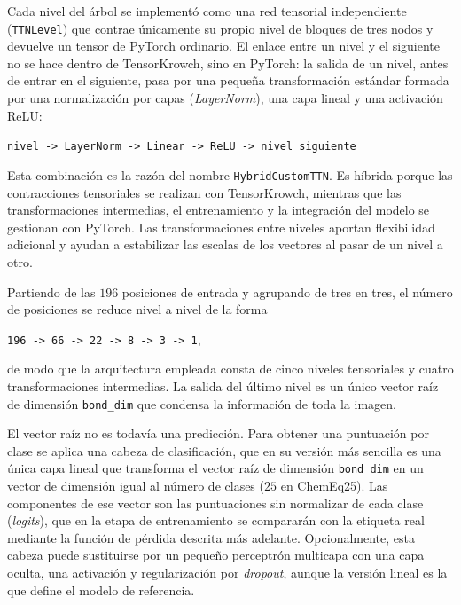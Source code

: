 Cada nivel del árbol se implementó como una red tensorial independiente (\texttt{TTNLevel}) que contrae únicamente su propio nivel de bloques de tres nodos y devuelve un tensor de PyTorch ordinario. El enlace entre un nivel y el siguiente no se hace dentro de TensorKrowch, sino en PyTorch: la salida de un nivel, antes de entrar en el siguiente, pasa por una pequeña transformación estándar formada por una normalización por capas (\textit{LayerNorm}), una capa lineal y una activación ReLU:

\begin{center}
\texttt{nivel -> LayerNorm -> Linear -> ReLU -> nivel siguiente}
\end{center}

Esta combinación es la razón del nombre \texttt{HybridCustomTTN}. Es híbrida porque las contracciones tensoriales se realizan con TensorKrowch, mientras que las transformaciones intermedias, el entrenamiento y la integración del modelo se gestionan con PyTorch. Las transformaciones entre niveles aportan flexibilidad adicional y ayudan a estabilizar las escalas de los vectores al pasar de un nivel a otro.

Partiendo de las $196$ posiciones de entrada y agrupando de tres en tres, el número de posiciones se reduce nivel a nivel de la forma

\begin{center}
\texttt{196 -> 66 -> 22 -> 8 -> 3 -> 1},
\end{center}

de modo que la arquitectura empleada consta de cinco niveles tensoriales y cuatro transformaciones intermedias. La salida del último nivel es un único vector raíz de dimensión \texttt{bond\_dim} que condensa la información de toda la imagen.

El vector raíz no es todavía una predicción. Para obtener una puntuación por clase se aplica una cabeza de clasificación, que en su versión más sencilla es una única capa lineal que transforma el vector raíz de dimensión \texttt{bond\_dim} en un vector de dimensión igual al número de clases ($25$ en ChemEq25). Las componentes de ese vector son las puntuaciones sin normalizar de cada clase (\textit{logits}), que en la etapa de entrenamiento se compararán con la etiqueta real mediante la función de pérdida descrita más adelante. Opcionalmente, esta cabeza puede sustituirse por un pequeño perceptrón multicapa con una capa oculta, una activación y regularización por \textit{dropout}, aunque la versión lineal es la que define el modelo de referencia.

